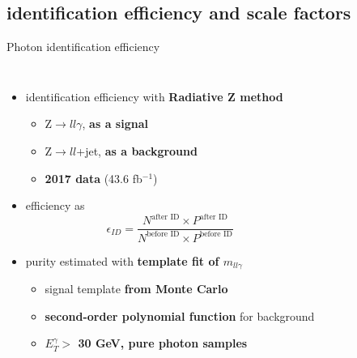 \subsection{identification efficiency and scale factors}
\begin{frame}{Photon identification efficiency}
\begin{columns}

\begin{itemize}
    \item identification efficiency with \textcolor{HHred}{\textbf{Radiative Z method}} 
    \begin{itemize}
        \item Z$\to ll\gamma$, \textbf{as a signal}
        \item Z$\to ll$+jet, \textbf{as a background}
        \item \textbf{2017 data} (43.6 fb$^{-1}$)
    \end{itemize}
    \item efficiency as
    \begin{equation*}
        \epsilon_{ID} = \frac{N^{\text{after ID}} \times P^{\text{after ID}}}{N^{\text{before ID}} \times P^{\text{before ID}}}
    \end{equation*}
    
    \item purity estimated with \textcolor{HHturquoise_d}{\textbf{template fit of $m_{ll\gamma}$}}
    \begin{itemize}
        \item signal template \textbf{from Monte Carlo}
        \item \textbf{second-order polynomial function} for background
        \item \textcolor{structurColor}{\textbf{$E_T^{\gamma} > $ 30 GeV, pure photon samples}} 
    \end{itemize}
\end{itemize}



\end{columns}
\end{frame}
